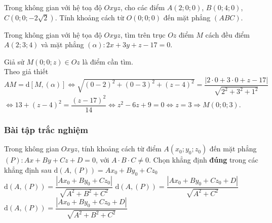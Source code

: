 \begin{vd}%
	Trong không gian với hệ toạ độ $Oxyz$, cho các điểm $A(2;0;0)$, $B(0;4;0)$, $C(0;0;-2\sqrt{2})$. Tính khoảng cách từ $O(0;0;0)$ đến mặt phẳng $(ABC)$.

\end{vd}
\begin{vd}%
	Trong không gian với hệ tọa độ $Oxyz$, tìm trên trục $Oz$ điểm $M$ cách đều điểm $A(2;3;4)$ và mặt phẳng $(\alpha )\colon 2x+3y+z-17=0.$

	\loigiai
	{Giả sử $M(0;0;z )\in Oz$ là điểm cần tìm.\\
		Theo giả thiết $AM=\mathrm{d}\left[ M,(\alpha ) \right]\Leftrightarrow \sqrt{(0-2 )^2+(0-3 )^2+(z-4 )^2}=\dfrac{\left| 2\cdot0+3\cdot0+z-17 \right|}{\sqrt{2^2+3^2+1^2}}$\\
		$\Leftrightarrow 13+(z-4 )^2=\dfrac{(z-17 )^2}{14}\Leftrightarrow z^2-6z+9=0\Leftrightarrow z=3\Rightarrow M(0;0;3)$.}
\end{vd}
\subsubsection{Bài tập trắc nghiệm}
\begin{ex}%
	Trong không gian $Oxyz$, tính khoảng cách từ điểm  $A\left(x_0;y_0;z_0\right)$ đến mặt phẳng $(P)\colon Ax+By+Cz+D=0$, với $A\cdot B\cdot C\ne 0$. Chọn khẳng định \textbf{đúng} trong các khẳng định sau
	\choice
	{$\mathrm{d}\left(A,(P)\right)=Ax_0+By_0+Cz_0$}
	{$\mathrm{d}\left(A,(P)\right)=\dfrac{\left|{Ax_0+By_0+Cz_0}\right|}{\sqrt{A^2+B^2+C^2}}$}
	{$\mathrm{d}\left(A,(P)\right)=\dfrac{\left|{Ax_0+By_0+Cz_0+D}\right|}{\sqrt{A^2+C^2}}$}
	{\True $\mathrm{d}\left(A,(P)\right)=\dfrac{\left|{Ax_0+By_0+Cz_0+D}\right|}{\sqrt{A^2+B^2+C^2}}$}
\end{ex}

